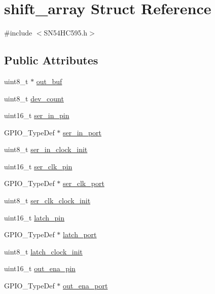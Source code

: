 \hypertarget{structshift__array}{}\section{shift\+\_\+array Struct Reference}
\label{structshift__array}


{\ttfamily \#include $<$S\+N54\+H\+C595.\+h$>$}

\subsection*{Public Attributes}
\begin{DoxyCompactItemize}
\item 
uint8\+\_\+t $\ast$ \hyperlink{structshift__array_acc0af6f687d9206b61f30a30649c6e7b}{out\+\_\+buf}
\item 
uint8\+\_\+t \hyperlink{structshift__array_a611f064ca0a91966cdf74bee3bbd70b7}{dev\+\_\+count}
\item 
uint16\+\_\+t \hyperlink{structshift__array_aad41beacd3338d42888e2667f4d39533}{ser\+\_\+in\+\_\+pin}
\item 
G\+P\+I\+O\+\_\+\+Type\+Def $\ast$ \hyperlink{structshift__array_a3960af92763cb85e389f33db5c1b4240}{ser\+\_\+in\+\_\+port}
\item 
uint8\+\_\+t \hyperlink{structshift__array_a3264639461353e29e806c3c3de81ae05}{ser\+\_\+in\+\_\+clock\+\_\+init}
\item 
uint16\+\_\+t \hyperlink{structshift__array_acc6ad8b65f9970509a759f44b11ffaf0}{ser\+\_\+clk\+\_\+pin}
\item 
G\+P\+I\+O\+\_\+\+Type\+Def $\ast$ \hyperlink{structshift__array_a788458c5a7a66e45b7dd326e24056fae}{ser\+\_\+clk\+\_\+port}
\item 
uint8\+\_\+t \hyperlink{structshift__array_a9420b38ae778043b666ee59201b55d5e}{ser\+\_\+clk\+\_\+clock\+\_\+init}
\item 
uint16\+\_\+t \hyperlink{structshift__array_aacdca1f8504bea1b39a6e8db7c47f672}{latch\+\_\+pin}
\item 
G\+P\+I\+O\+\_\+\+Type\+Def $\ast$ \hyperlink{structshift__array_a5eede82721d96c9b9e5fb395f1eea14f}{latch\+\_\+port}
\item 
uint8\+\_\+t \hyperlink{structshift__array_abd5c6e308cc8500929613a89500a01a1}{latch\+\_\+clock\+\_\+init}
\item 
uint16\+\_\+t \hyperlink{structshift__array_a1d749f673142be00311e177f5dfcc8e0}{out\+\_\+ena\+\_\+pin}
\item 
G\+P\+I\+O\+\_\+\+Type\+Def $\ast$ \hyperlink{structshift__array_ad495cc95f258cd85d35b01aab0e5d160}{out\+\_\+ena\+\_\+port}

\end{DoxyCompactItemize}
